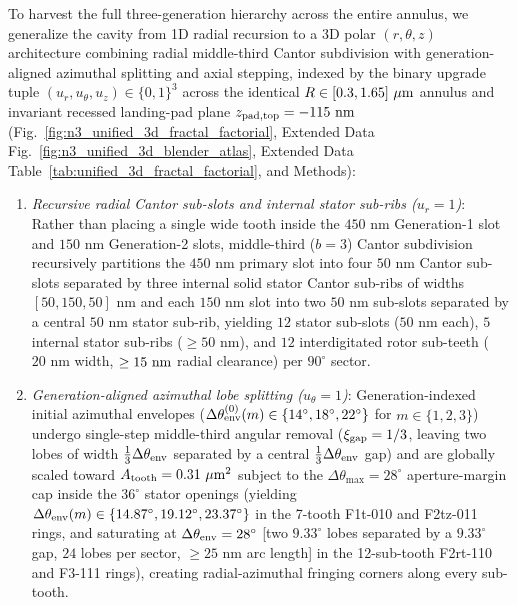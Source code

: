 \documentclass[pdflatex,sn-nature]{sn-jnl}
\DeclareRobustCommand{\roundthree}[1]{\fpeval{round(#1,3)}}
\begin{document}
To harvest the full three-generation hierarchy across the entire annulus, we generalize the cavity from 1D radial recursion to a 3D polar $(r, \theta, z)$ architecture combining radial middle-third Cantor subdivision with generation-aligned azimuthal splitting and axial stepping, indexed by the binary upgrade tuple $(u_r, u_\theta, u_z) \in \{0,1\}^3$ across the identical $R \in [0.3{}, 1.65{}]\ \mu\text{m}$ annulus and invariant recessed landing-pad plane $z_{\rm pad,top} = -115\text{ nm}$ (Fig.~\ref{fig:n3_unified_3d_fractal_factorial}, Extended Data Fig.~\ref{fig:n3_unified_3d_blender_atlas}, Extended Data Table~\ref{tab:unified_3d_fractal_factorial}, and Methods):
\begin{enumerate}
    \item \emph{Recursive radial Cantor sub-slots and internal stator sub-ribs ($u_r = 1$)}: Rather than placing a single wide tooth inside the $450\text{ nm}$ Generation-1 slot and $150\text{ nm}$ Generation-2 slots, middle-third ($b=3$) Cantor subdivision recursively partitions the $450\text{ nm}$ primary slot into four $50\text{ nm}$ Cantor sub-slots separated by three internal solid stator Cantor sub-ribs of widths $[50, 150, 50]\text{ nm}$ and each $150\text{ nm}$ slot into two $50\text{ nm}$ sub-slots separated by a central $50\text{ nm}$ stator sub-rib, yielding $12$ stator sub-slots ($50\text{ nm}$ each), $5$ internal stator sub-ribs ($\ge 50\text{ nm}$), and $12$ interdigitated rotor sub-teeth ($20\text{ nm}$ width, $\ge 15{}\text{ nm}$ radial clearance) per $90^\circ$ sector.
    \item \emph{Generation-aligned azimuthal lobe splitting ($u_\theta = 1$)}: Generation-indexed initial azimuthal envelopes ($\Delta\theta_{\rm env}^{(0)}(m) \in \{14^\circ, 18^\circ, 22^\circ\}$ for $m \in \{1,2,3\}$) undergo single-step middle-third angular removal ($\xi_{\rm gap} = 1/3$, leaving two lobes of width $\frac{1}{3}\Delta\theta_{\rm env}$ separated by a central $\frac{1}{3}\Delta\theta_{\rm env}$ gap) and are globally scaled toward $A_{\rm tooth} = \roundthree{\NthreeUnithreedFzerozerozeroAreaUmtwo}\ \mu\text{m}^2$ subject to the $\Delta\theta_{\max} = 28^\circ$ aperture-margin cap inside the $36^\circ$ stator openings (yielding $\Delta\theta_{\rm env}(m) \in \{14.87^\circ, 19.12^\circ, 23.37^\circ\}$ in the 7-tooth F1t-010 and F2tz-011 rings, and saturating at $\Delta\theta_{\rm env} = 28^\circ$ [two $9.33^\circ$ lobes separated by a $9.33^\circ$ gap, $24$ lobes per sector, $\ge 25\text{ nm}$ arc length] in the 12-sub-tooth F2rt-110 and F3-111 rings), creating radial-azimuthal fringing corners along every sub-tooth.

\end{enumerate}
\end{document}
